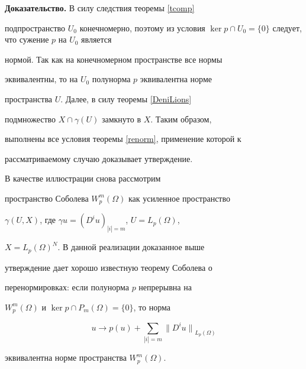 {\bf Доказательство.} В силу следствия теоремы \ref{tcomp}


подпространство $U_0$ конечномерно, поэтому из условия $\ker p


\cap U_0=\{0\}$ следует, что сужение $p$ на $U_0$ является


нормой. Так как на конечномерном пространстве все нормы


эквивалентны, то на $U_0$ полунорма $p$ эквивалентна норме


пространства $U$. Далее, в силу теоремы \ref{DeniLions}


подмножество $X \cap \gamma(U)$ замкнуто в $X$. Таким образом,


выполнены все условия теоремы \ref{renorm}, применение которой к


рассматриваемому случаю доказывает утверждение.





\begin{examnonum}


В качестве иллюстрации снова рассмотрим


пространство Соболева $W^m_p(\Omega)$ как усиленное пространство


$\gamma(U,X)$, где $\gamma u=(D^i u)_{|i|=m}$, $U=L_p(\Omega)$,


$X=L_p(\Omega)^N$. В данной реализации доказанное выше


утверждение дает хорошо известную теорему Соболева о


перенормировках: если полунорма $p$ непрерывна на


$W^m_p(\Omega)$ и $\ker p \cap P_m(\Omega)=\{0\}$, то норма


$$


u \to p(u)+\sum_{|i|=m} {\|D^i u\|}_{L_p(\Omega)}


$$


эквивалентна норме пространства $W^m_p(\Omega)$.


\end{examnonum}








